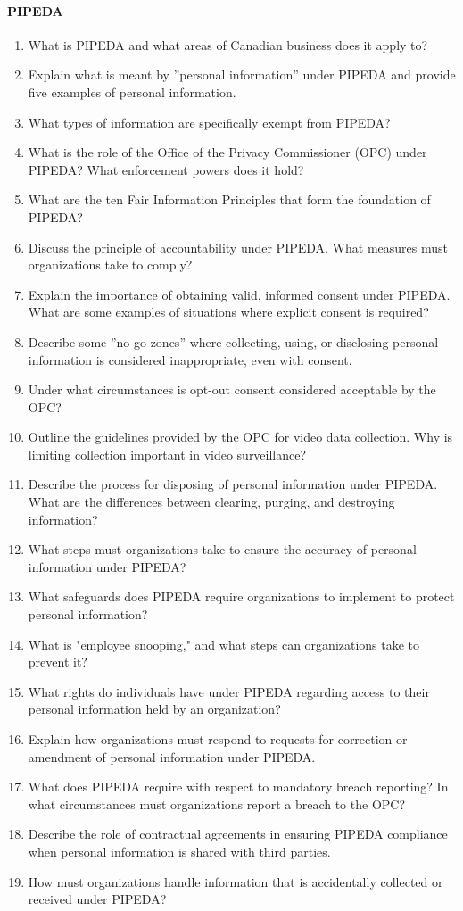\paragraph*{PIPEDA}
\begin{enumerate}
	\item What is PIPEDA and what areas of Canadian business does it apply to?
	\item Explain what is meant by ''personal information'' under PIPEDA and provide five examples of personal information.
	\item What types of information are specifically exempt from PIPEDA?
	\item What is the role of the Office of the Privacy Commissioner (OPC) under PIPEDA? What enforcement powers does it hold?
	\item What are the ten Fair Information Principles that form the foundation of PIPEDA?
	\item Discuss the principle of accountability under PIPEDA. What measures must organizations take to comply?
	\item Explain the importance of obtaining valid, informed consent under PIPEDA. What are some examples of situations where explicit consent is required?
	\item Describe some ''no-go zones'' where collecting, using, or disclosing personal information is considered inappropriate, even with consent.
	\item Under what circumstances is opt-out consent considered acceptable by the OPC?
	\item Outline the guidelines provided by the OPC for video data collection. Why is limiting collection important in video surveillance?
	\item Describe the process for disposing of personal information under PIPEDA. What are the differences between clearing, purging, and destroying information?
	\item What steps must organizations take to ensure the accuracy of personal information under PIPEDA?
	\item What safeguards does PIPEDA require organizations to implement to protect personal information?
	\item What is "employee snooping," and what steps can organizations take to prevent it?
	\item What rights do individuals have under PIPEDA regarding access to their personal information held by an organization?
	\item Explain how organizations must respond to requests for correction or amendment of personal information under PIPEDA.
	\item What does PIPEDA require with respect to mandatory breach reporting? In what circumstances must organizations report a breach to the OPC?
	\item Describe the role of contractual agreements in ensuring PIPEDA compliance when personal information is shared with third parties.
	\item How must organizations handle information that is accidentally collected or received under PIPEDA?
\end{enumerate}
